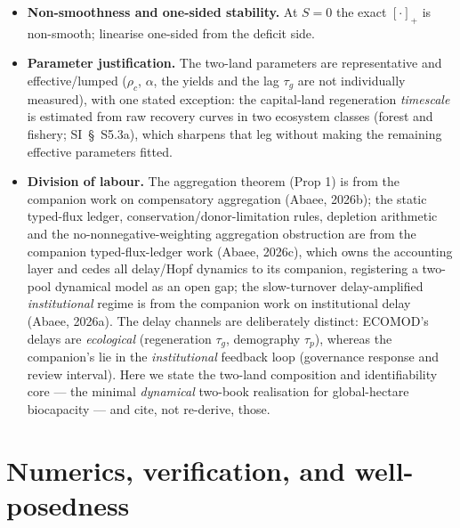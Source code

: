 \documentclass[11pt]{article}
\begin{document}
\begin{itemize}
\item \textbf{Non-smoothness and one-sided stability.} At $S=0$ the exact $[\cdot]_+$ is non-smooth; linearise one-sided from the deficit side.
\item \textbf{Parameter justification.} The two-land parameters are representative and effective/lumped ($\rho_c$, $\alpha$, the yields and the lag $\tau_g$ are not individually measured), with one stated exception: the capital-land regeneration \emph{timescale} is estimated from raw recovery curves in two ecosystem classes (forest and fishery; SI~\S\ S5.3a), which sharpens that leg without making the remaining effective parameters fitted.
\item \textbf{Division of labour.} The aggregation theorem (Prop 1) is from the companion work on compensatory aggregation (Abaee, 2026b); the static typed-flux ledger, conservation/donor-limitation rules, depletion arithmetic and the no-nonnegative-weighting aggregation obstruction are from the companion typed-flux-ledger work (Abaee, 2026c), which owns the accounting layer and cedes all delay/Hopf dynamics to its companion, registering a two-pool dynamical model as an open gap; the slow-turnover delay-amplified \emph{institutional} regime is from the companion work on institutional delay (Abaee, 2026a). The delay channels are deliberately distinct: ECOMOD's delays are \emph{ecological} (regeneration $\tau_g$, demography $\tau_p$), whereas the companion's lie in the \emph{institutional} feedback loop (governance response and review interval). Here we state the two-land composition and identifiability core --- the minimal \emph{dynamical} two-book realisation for global-hectare biocapacity --- and cite, not re-derive, those.
\end{itemize}

\section{Numerics, verification, and well-posedness}
\end{document}

